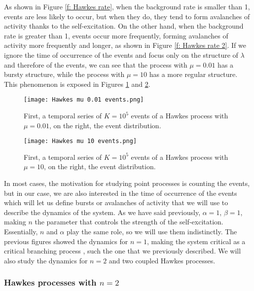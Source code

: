 As shown in Figure \ref{f: Hawkes rate}, when the background rate is smaller than 1, events are less likely to occur, but when they do, they tend to form avalanches of activity thanks 
to the self-excitation. On the other hand, when the background rate is greater than 1, events occur more frequently, forming avalanches of activity more frequently and longer, as
shown in Figure \ref{f: Hawkes rate 2}. If we ignore the time of occurrence of the events and focus only on the structure of $\lambda$ and therefore of the events, we can see that
the process with $\mu=0.01$ has a bursty structure, while the process with $\mu=10$ has a more regular structure. This phenomenon is exposed in Figures \ref{f: Hawkes rate burst} and
\ref{f: Hawkes rate burst 2}.

\begin{figure}[H]
    \centering
    \texttt{[image: Hawkes mu 0.01 events.png]}
    \caption{First, a temporal series of $K=10^5$ events of a Hawkes process with $\mu=0.01$, on the right, the event distribution.}
    \label{f: Hawkes rate burst}    
\end{figure}

\begin{figure}[H]
    \centering
    \texttt{[image: Hawkes mu 10 events.png]}
    \caption{First, a temporal series of $K=10^5$ events of a Hawkes process with $\mu=10$, on the right, the event distribution.}
    \label{f: Hawkes rate burst 2}    
\end{figure}

In most cases, the motivation for studying point processes is counting the events, but in our case, we are also interested in the time of occurrence of the events
which will let us define bursts or avalanches of activity that we will use to describe the dynamics of the system. 
As we have said previously, $\alpha = 1$, $\beta = 1$, making $n$ the parameter that controls the strength of the self-excitation. Essentially, $n$ and $\alpha$ play the same role,
so we will use them indistinctly. The previous figures showed the dynamics for $n=1$, making the system critical as a critical branching process \cite{notarmuzi2021percolation}, 
such the one that we previously described. We will also study the dynamics for $n=2$ and two coupled Hawkes processes.

\subsubsection{Hawkes processes with $n=2$} \label{subsubsec:Hawkes_processes_n_2}

